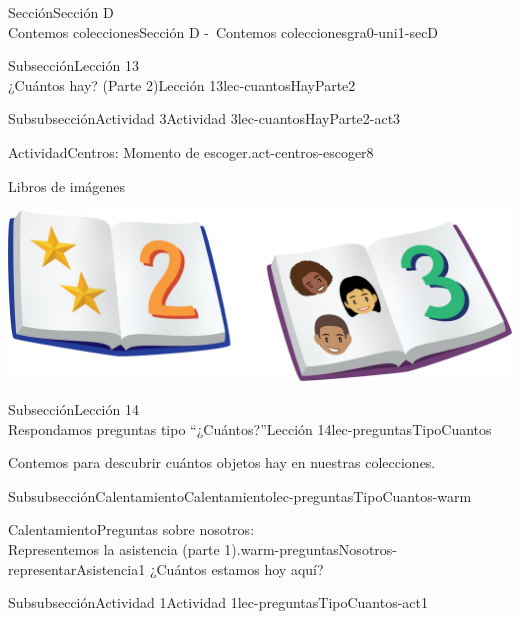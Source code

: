 \begin{sectionptx}{Sección}{{\Large Sección D\\}Contemos colecciones}{}{Sección D -~Contemos colecciones}{}{}{gra0-uni1-secD}
\begin{subsectionptx}{Subsección}{{\normalsize Lección 13\\[-0.05cm]}¿Cuántos hay? (Parte 2)}{}{Lección 13}{}{}{lec-cuantosHayParte2}
\begin{subsubsectionptx}{Subsubsección}{Actividad 3}{}{Actividad 3}{}{}{lec-cuantosHayParte2-act3}
\begin{activity}{Actividad}{Centros: Momento de escoger.}{act-centros-escoger8}
\begin{sidebyside}{2}{0.025}{0.025}{0.05}
\begin{sbspanel}{0.45}%
Libros de imágenes%
\par
\includegraphics[max width=\linewidth, center]{external/png-source/K.1.D Beta Student Workbooks.Books.png}
\end{sbspanel}%
\end{sidebyside}%
\end{activity}%
\end{subsubsectionptx}
\end{subsectionptx}
%
%
\typeout{************************************************}
\typeout{************************************************}
%
\begin{subsectionptx}{Subsección}{{\normalsize Lección 14\\[-0.05cm]}Respondamos preguntas tipo “¿Cuántos?”}{}{Lección 14}{}{}{lec-preguntasTipoCuantos}
\begin{introduction}{}%
Contemos para descubrir cuántos objetos hay en nuestras colecciones. 
\end{introduction}%
%
%
\typeout{************************************************}
\typeout{************************************************}
%
\begin{subsubsectionptx}{Subsubsección}{Calentamiento}{}{Calentamiento}{}{}{lec-preguntasTipoCuantos-warm}
\begin{exploration}{Calentamiento}{Preguntas sobre nosotros:\\Representemos la asistencia (parte 1).}{warm-preguntasNosotros-representarAsistencia1}%
¿Cuántos estamos hoy aquí?%
\end{exploration}%
\end{subsubsectionptx}
%
%
\typeout{************************************************}
\typeout{************************************************}
%
\begin{subsubsectionptx}{Subsubsección}{Actividad 1}{}{Actividad 1}{}{}{lec-preguntasTipoCuantos-act1}

\end{subsubsectionptx}
\end{subsectionptx}
\end{sectionptx}
